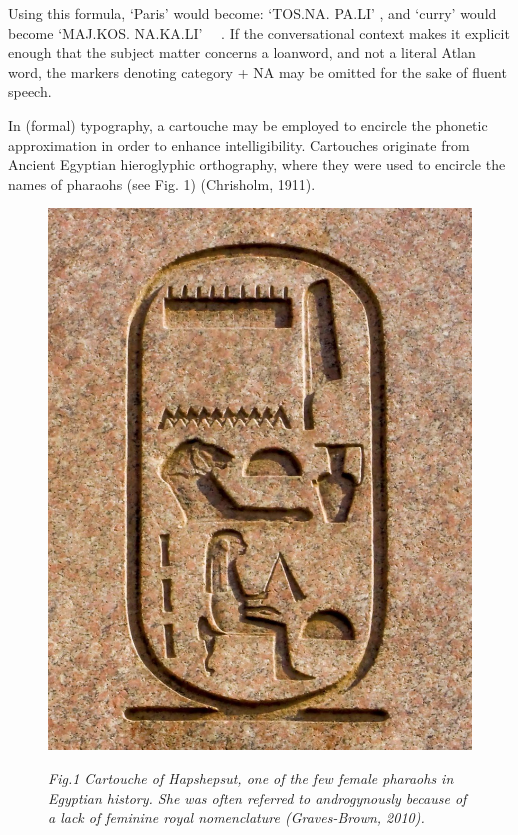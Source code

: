 Using this formula, ‘Paris’ would become: ‘TOS.NA. PA.LI’ \tos\na \cartouche{\pa \li}, and ‘curry’ would become ‘MAJ.KOS. NA.KA.LI’ \maj\kos\ \ \na \cartouche{\ka \li}. If the conversational context makes it explicit enough that the subject matter concerns a loanword, and not a literal Atlan word, the markers denoting category + NA may be omitted for the sake of fluent speech.  

In (formal) typography, a cartouche may be employed to encircle the phonetic approximation in order to enhance intelligibility. Cartouches originate from Ancient Egyptian hieroglyphic orthography, where they were used to encircle the names of pharaohs (see Fig. 1) (Chrisholm, 1911).  

\begin{figure}
\includegraphics[scale=0.1]{./Images/Cartouche.jpeg}

	{\footnotesize \it Fig.1 Cartouche of Hapshepsut, one of the few female pharaohs in Egyptian history. She was often referred to androgynously because of a lack of feminine royal nomenclature (Graves-Brown, 2010). }

\end{figure}
 

